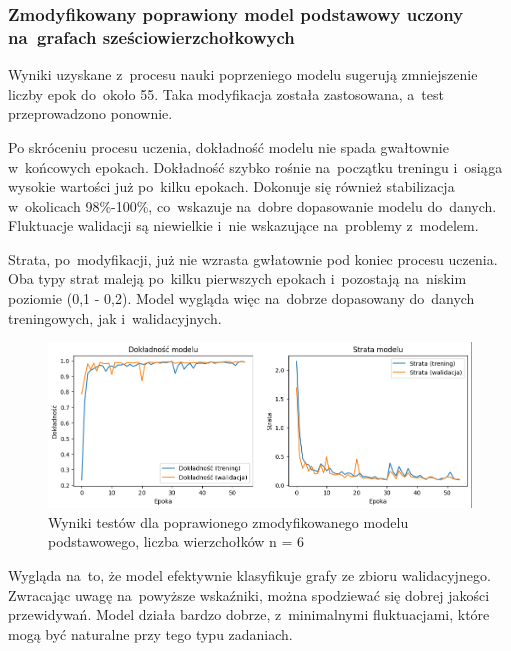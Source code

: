 
\subsubsection{Zmodyfikowany poprawiony model podstawowy uczony na~grafach sześciowierzchołkowych}

Wyniki uzyskane z~procesu nauki poprzeniego modelu sugerują zmniejszenie liczby epok do~około 55.
Taka modyfikacja została zastosowana, a~test przeprowadzono ponownie.

Po skróceniu procesu uczenia, dokładność modelu nie spada gwałtownie w~końcowych epokach.
Dokładność szybko rośnie na~początku treningu i~osiąga wysokie wartości już po~kilku epokach.
Dokonuje się również stabilizacja w~okolicach 98\%-100\%, co~wskazuje na~dobre dopasowanie modelu do~danych.
Fluktuacje walidacji są niewielkie i~nie wskazujące na~problemy z~modelem.

Strata, po~modyfikacji, już nie wzrasta gwłatownie pod koniec procesu uczenia.
Oba typy strat maleją po~kilku pierwszych epokach i~pozostają na~niskim poziomie (0,1 - 0,2).
Model wygląda więc na~dobrze dopasowany do~danych treningowych, jak i~walidacyjnych.

\begin{figure}[ht]
	\centering
	\includegraphics[width=15.5cm]{resources/tests/images/v4/base6_1_1_img.png}
	\caption{Wyniki testów dla poprawionego zmodyfikowanego modelu podstawowego, liczba wierzchołków n = 6}
	\label{Fig:tests-best-1a}
\end{figure}
\FloatBarrier

Wygląda na~to, że model efektywnie klasyfikuje grafy ze zbioru walidacyjnego.
Zwracając uwagę na~powyższe wskaźniki, można spodziewać się dobrej jakości przewidywań.
Model działa bardzo dobrze, z~minimalnymi fluktuacjami, które mogą być naturalne przy tego typu zadaniach.

